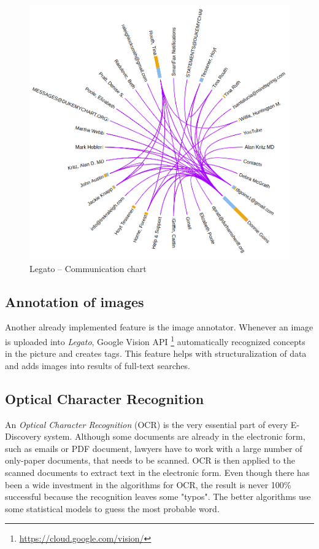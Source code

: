 \documentclass[
  digital, %
  table,   %
  lof,     %
  lot,     %
]{fithesis3}
\begin{document}
\begin{figure}[h]
\caption{Legato -- Communication chart}
\label{fig:legato_communication}
\includegraphics[width=\textwidth]{img/Legato-Communication}
\end{figure}

\subsection*{Annotation of images}
Another already implemented feature is the image annotator.
Whenever an image is uploaded into \textit{Legato}, Google Vision API \footnote{\url{https://cloud.google.com/vision/}} automatically recognized concepts in the picture and creates tags.
This feature helps with structuralization of data and adds images into results of full-text searches.

\subsection*{Optical Character Recognition}
An \textit{Optical Character Recognition} (OCR) is the very essential part of every E-Discovery system.
Although some documents are already in the electronic form, such as emails or PDF document, lawyers have to work with a large number of only-paper documents, that needs to be scanned.
OCR is then applied to the scanned documents to extract text in the electronic form.
Even though there has been a wide investment in the algorithms for OCR, the result is never 100\% successful because the recognition leaves some "typos".
The better algorithms use some statistical models to guess the most probable word.
\end{document}
